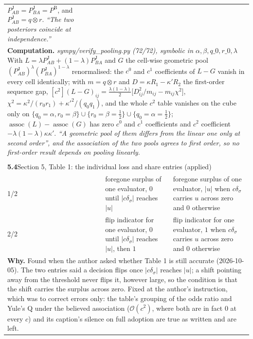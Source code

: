 \documentclass[10pt]{article}
\theoremstyle{definition}
\newcommand{\PB}{P^{\mathrm{B}}}
\newcommand{\PJ}{P^{\mathrm{J}}}
\newcommand{\assoc}{\operatorname{assoc}}
\newcommand{\bigO}{\mathcal{O}}
\newlength{\fullw}\setlength{\fullw}{25.9cm}
\newcommand{\entryhead}[2]{\multicolumn{3}{|l|}{\rule{0pt}{2.6ex}\large\textbf{#1}\quad #2} \\ \hline}
\begin{document}
{\begin{longtable}{|p{0.9cm}|p{12.2cm}|p{12.2cm}|}
{$\PJ_{AB}=\PJ_{BA}=\PB$, and $\PJ_{AB}=q\otimes r$. \newline \textit{``The two posteriors coincide at independence.''}} \\
\multicolumn{3}{|p{\fullw}|}{\textbf{Computation.} \textit{sympy/verify\_pooling.py (72/72), symbolic in $\alpha,\beta,q\_0,r\_0,\lambda$} \newline With $L=\lambda\PJ_{AB}+(1-\lambda)\PJ_{BA}$ and $G$ the cell-wise geometric pool
$(\PJ_{AB})^{\lambda}(\PJ_{BA})^{1-\lambda}$ renormalised: the $c^0$ and $c^1$ coefficients of
$L-G$ vanish in every cell identically; with $m=q\otimes r$ and $D=\kappa R_1-\kappa'R_2$ the
first-order sequence gap, $[c^2](L-G)_{ij}=\tfrac{\lambda(1-\lambda)}{2}\bigl[D_{ij}^2/m_{ij}-m_{ij}\chi^2\bigr]$,
$\chi^2=\kappa^2/(r_0r_1)+\kappa'^2/(q_0q_1)$, and the whole $c^2$ table vanishes on the cube
only on $\{q_0=\alpha,r_0=\beta\}\cup\{r_0=\beta=\tfrac12\}\cup\{q_0=\alpha=\tfrac12\}$;
$\assoc(L)-\assoc(G)$ has zero $c^0$ and $c^1$ coefficients and $c^2$ coefficient
$-\lambda(1-\lambda)\kappa\kappa'$. \newline \textit{``A geometric pool of them differs from the linear one only at second order'', and the association of the two pools agrees to first order, so no first-order result depends on pooling linearly.}} \\ \hline
\multicolumn{3}{|l|}{} \\ \hline
\entryhead{5.4}{Section 5, Table 1: the individual loss and share entries (applied)\quad{\footnotesize\textit{(formerly C.33)}}}
1/2 & foregone surplus of one evaluator, $0$ until $|c\delta_\sigma|$ reaches $|u|$ & foregone surplus of one evaluator, $|u|$ when $c\delta_\sigma$ carries $u$ across zero and $0$ otherwise \\ \hline
2/2 & flip indicator for one evaluator, $0$ until $|c\delta_\sigma|$ reaches $|u|$, then $1$ & flip indicator for one evaluator, $1$ when $c\delta_\sigma$ carries $u$ across zero and $0$ otherwise \\ \hline
\multicolumn{3}{|p{\fullw}|}{\textbf{Why.} Found when the author asked whether Table 1 is still accurate (2026-10-05). The two entries said a decision flips once $|c\delta_\sigma|$ reaches $|u|$; a shift pointing away from the threshold never flips it, however large, so the condition is that the shift carries the surplus across zero. Fixed at the author's instruction, which was to correct errors only: the table's grouping of the odds ratio and Yule's Q under the believed association ($\bigO(c^2)$, where both are in fact 0 at every $c$) and its caption's silence on full adoption are true as written and are left.} \\

\end{longtable}}
\end{document}
